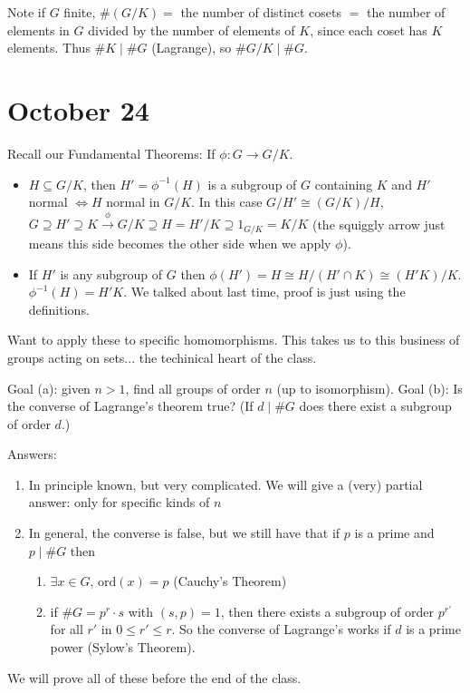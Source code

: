 \documentclass{article}
\theoremstyle{plain}
\theoremstyle{remark}
\begin{document}
Note if $G$ finite, $\#(G/K) =$ the number of distinct cosets $=$
the number of elements in $G$ divided by the number of elements of $K$,
since each coset has $K$ elements.
Thus $\#K \mid \#G$ (Lagrange), so $\#G/K \mid \#G$.

\section{October 24}
Recall our Fundamental Theorems:
If $\phi \colon G \to G/K$.
\begin{itemize}
	\item $H \subseteq G/K$,
		then $H' = \phi^{-1}(H)$ is a subgroup of $G$ containing $K$
		and $H'$ normal $\iff H$ normal in $G/K$.
		In this case $G/H' \cong (G/K)/H$,
		$G \supseteq H' \supseteq K \xrightarrow{\phi} G/K
		\supseteq H = H'/K \supseteq 1_{G/K} = K/K$
		(the squiggly arrow just means this side becomes the other side
		when we apply $\phi$).
	\item If $H'$ is any subgroup of $G$ then
		$\phi(H') = H \cong H/(H' \cap K) \cong (H'K)/K$.
		$\phi^{-1}(H) = H'K$.
		We talked about last time,
		proof is just using the definitions.
\end{itemize}

Want to apply these to specific homomorphisms.
This takes us to this business of groups acting on sets...
the techinical heart of the class.

Goal (a): given $n > 1$, find all groups of order $n$ (up to isomorphism).
Goal (b): Is the converse of Lagrange's theorem true?
(If $d \mid \#G$ does there exist a subgroup of order $d$.)

Answers:
\begin{enumerate}
	\item In principle known, but very complicated.
		We will give a (very) partial answer:
		only for specific kinds of $n$
	\item In general, the converse is false, but we still have that
		if $p$ is a prime and $p \mid \#G$ then
		\begin{enumerate}
			\item $\exists x \in G$, $\mathrm{ord}(x) = p$ (Cauchy's Theorem)
			\item if $\#G = p^r\cdot s$ with $(s,p) = 1$,
				then there exists a subgroup of order $p^{r'}$
				for all $r'$ in $0 \leq r' \leq r$.
				So the converse of Lagrange's works if $d$ is a prime power
				(Sylow's Theorem).
		\end{enumerate}
\end{enumerate}
We will prove all of these before the end of the class.
\end{document}
